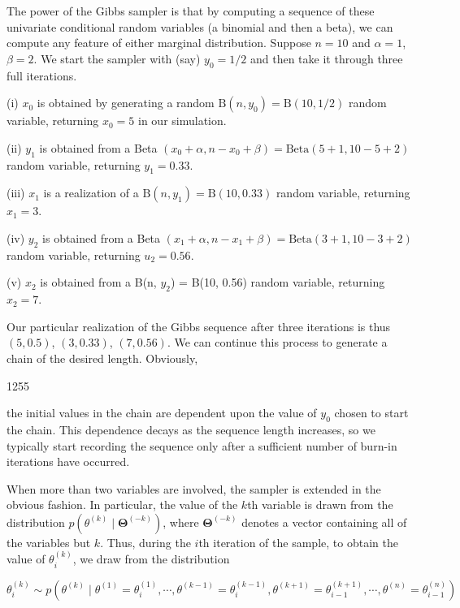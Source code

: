 \documentclass{article}
\begin{document}
The power of the Gibbs sampler is that by computing a sequence of these univariate conditional random variables (a binomial and then a beta), we can compute any feature of either marginal distribution. Suppose  $ n = 10 $ and  $ \alpha = 1 $,  $ \beta = 2 $. We start the sampler with (say)  $ y_0 = 1/2 $ and then take it through three full iterations.

(i)  $ x_{0} $ is obtained by generating a random  $ \mathrm{B}(n, y_{0}) = \mathrm{B}(10, 1/2) $ random variable, returning  $ x_{0} = 5 $ in our simulation.

(ii)  $ y_{1} $ is obtained from a Beta  $ (x_{0}+\alpha, n-x_{0}+\beta)=\mathrm{Beta}(5+1, 10-5+2) $ random variable, returning  $ y_{1}=0.33 $.

(iii)  $ x_{1} $ is a realization of a  $ \mathrm{B}(n, y_{1}) = \mathrm{B}(10, 0.33) $ random variable, returning  $ x_{1} = 3 $.

(iv)  $ y_{2} $ is obtained from a Beta  $ (x_{1}+\alpha, n-x_{1}+\beta)=\mathrm{Beta}(3+1, 10-3+2) $ random variable, returning  $ u_{2}=0.56 $.

(v)  $ x_{2} $ is obtained from a B(n,  $ y_{2} $) = B(10, 0.56) random variable, returning  $ x_{2} = 7 $.

Our particular realization of the Gibbs sequence after three iterations is thus  $ (5, 0.5) $,  $ (3, 0.33) $,  $ (7, 0.56) $. We can continue this process to generate a chain of the desired length. Obviously,

1255

the initial values in the chain are dependent upon the value of  $ y_{0} $ chosen to start the chain. This dependence decays as the sequence length increases, so we typically start recording the sequence only after a sufficient number of burn-in iterations have occurred.

When more than two variables are involved, the sampler is extended in the obvious fashion. In particular, the value of the  $ k $th variable is drawn from the distribution  $ p(\theta^{(k)} \mid \boldsymbol{\Theta}^{(-k)}) $, where  $ \boldsymbol{\Theta}^{(-k)} $ denotes a vector containing all of the variables but  $ k $. Thus, during the  $ i $th iteration of the sample, to obtain the value of  $ \theta_i^{(k)} $, we draw from the distribution

\begin{equation}
\theta_{i}^{(k)}\sim p(\theta^{(k)}\mid\theta^{(1)}=\theta_{i}^{(1)},\cdots,\theta^{(k-1)}=\theta_{i}^{(k-1)},\theta^{(k+1)}=\theta_{i-1}^{(k+1)},\cdots,\theta^{(n)}=\theta_{i-1}^{(n)})
\end{equation}
\end{document}
